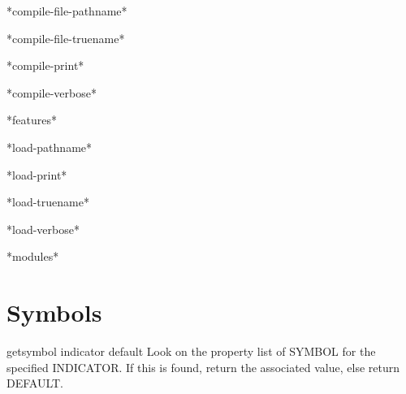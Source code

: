 \documentclass[10pt,english]{book}
\begin{document}
\begin{variable}{*compile-file-pathname*}{}
  
\end{variable}

\begin{variable}{*compile-file-truename*}{}
  
\end{variable}

\begin{variable}{*compile-print*}{}
  
\end{variable}

\begin{variable}{*compile-verbose*}{}
  
\end{variable}

\begin{variable}{*features*}{}
  
\end{variable}

\begin{variable}{*load-pathname*}{}
  
\end{variable}

\begin{variable}{*load-print*}{}
  
\end{variable}

\begin{variable}{*load-truename*}{}
  
\end{variable}

\begin{variable}{*load-verbose*}{}
  
\end{variable}

\begin{variable}{*modules*}{}
  
\end{variable}

\section{Symbols}

\begin{accessor}{get}{symbol indicator \op default}
  Look on the property list of SYMBOL for the specified INDICATOR. If this
  is found, return the associated value, else return DEFAULT.
\end{accessor}
\end{document}
